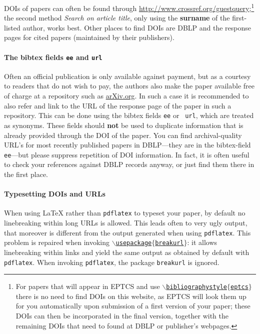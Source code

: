 \documentclass[submission,copyright,creativecommons]{eptcs}
\begin{document}
DOIs of papers can often be found through
\url{http://www.crossref.org/guestquery};\footnote{For papers that will appear
  in EPTCS and use \href{http://eptcs.web.cse.unsw.edu.au/eptcs.bst}
  {\tt $\backslash$bibliographystyle$\{$eptcs$\}$} there is no need to
  find DOIs on this website, as EPTCS will look them up for you
  automatically upon submission of a first version of your paper;
  these DOIs can then be incorporated in the final version, together
  with the remaining DOIs that need to found at DBLP or publisher's webpages.}
the second method {\it Search on article title}, only using the {\bf
surname} of the first-listed author, works best.  
Other places to find DOIs are DBLP and the response pages for cited
papers (maintained by their publishers).

\paragraph{The bibtex fields {\tt ee} and {\tt url}}

Often an official publication is only available against payment, but
as a courtesy to readers that do not wish to pay, the authors also
make the paper available free of charge at a repository such as
\url{arXiv.org}. In such a case it is recommended to also refer and
link to the URL of the response page of the paper in such a
repository.  This can be done using the bibtex fields {\tt ee} or {\tt
url}, which are treated as synonyms.  These fields should \textbf{not} be used
to duplicate information that is already provided through the DOI of
the paper.
You can find archival-quality URL's for most recently published papers
in DBLP---they are in the bibtex-field {\tt ee}---but please suppress
repetition of DOI information. In fact, it is often
useful to check your references against DBLP records anyway, or just find
them there in the first place.

\paragraph{Typesetting DOIs and URLs}

When using {\LaTeX} rather than {\tt pdflatex} to typeset your paper, by
default no linebreaking within long URLs is allowed. This leads often
to very ugly output, that moreover is different from the output
generated when using {\tt pdflatex}. This problem is repaired when
invoking \href{http://eptcs.web.cse.unsw.edu.au/breakurl.sty}
{\tt $\backslash$usepackage$\{$breakurl$\}$}: it allows linebreaking
within links and yield the same output as obtained by default with
{\tt pdflatex}. 
When invoking {\tt pdflatex}, the package {\tt breakurl} is ignored.
\end{document}
